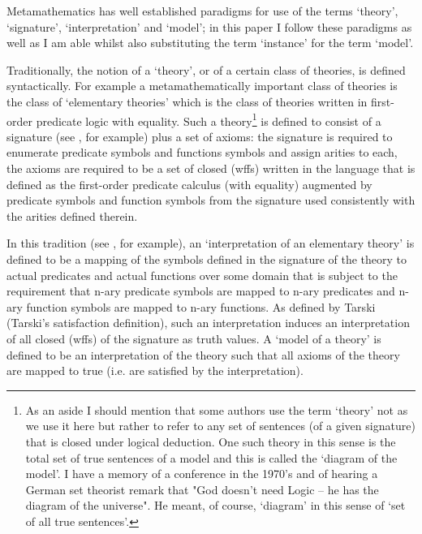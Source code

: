 \note  Metamathematics has well established paradigms for use of the terms
`theory', `signature', `interpretation' and  `model';
in this paper I follow these paradigms
 as well as I am able whilst also substituting the term `instance' for the term `model'. 

Traditionally, the notion of a `theory', or of a certain class of theories, is  defined syntactically.
For example a metamathematically important class of theories  is the class of `elementary theories' 
which is the class of theories written in first-order predicate logic with equality. 
Such a theory\footnote {As an aside I should mention that some authors use the term `theory' not as we use it here but rather to refer to any set of sentences (of a given signature) that is closed under logical deduction. One such theory in this sense is the total set of true sentences of a model and  
this is called the `diagram of the model'. I have a  memory of a conference in the 1970's and of hearing a German set theorist
 remark that "God doesn't need Logic -- he has the diagram of the universe". He meant, of course, `diagram' in this sense of `set of all true sentences'.
} is defined to consist of a signature (see \cite{HodgesModelTheory}, for example) plus a set of axioms: 
the signature is required to enumerate predicate symbols and functions symbols and assign arities to each, 
the axioms are required  to be a set of closed  (wffs) written
in the language that is defined as the first-order predicate calculus (with equality)
 augmented by predicate symbols and function symbols from the signature used consistently with the arities defined therein. 

\note In this tradition (see \cite{Mendelson}, for example), an `interpretation of an elementary theory' is defined to be a mapping of the symbols defined in the signature 
of the theory to actual predicates and actual functions over some domain that is subject to the requirement that n-ary predicate symbols are mapped to n-ary predicates and n-ary function symbols are mapped to n-ary functions.
As defined by Tarski (Tarski's satisfaction definition), 
such an interpretation induces an interpretation of all
closed  (wffs) of the signature as truth values. 
A `model of a theory' is defined to be an interpretation of the theory such that all axioms of the theory are mapped to true (i.e. are satisfied by the interpretation). 

